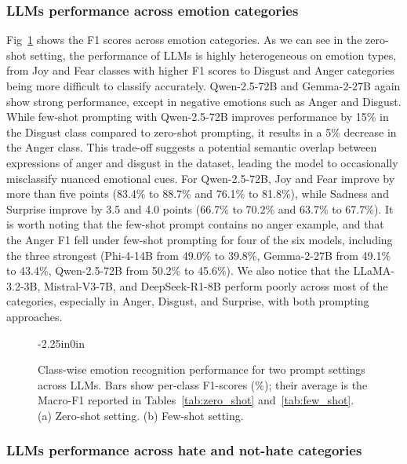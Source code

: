 \documentclass[10pt,letterpaper]{article}
\begin{document}
\subsubsection*{LLMs performance across emotion categories}

Fig~\ref{fig:emo_classwise} shows the F1 scores across emotion categories. As we can see in the zero-shot setting, the performance of LLMs is highly heterogeneous on emotion types, from Joy and Fear classes with higher F1 scores to Disgust and Anger categories being more difficult to classify accurately. Qwen-2.5-72B and Gemma-2-27B again show strong performance, except in negative emotions such as Anger and Disgust. While few-shot prompting with Qwen-2.5-72B improves performance by 15\% in the Disgust class compared to zero-shot prompting, it results in a 5\% decrease in the Anger class. This trade-off suggests a potential semantic overlap between expressions of anger and disgust in the dataset, leading the model to occasionally misclassify nuanced emotional cues. For Qwen-2.5-72B, Joy and Fear improve by more than five points (83.4\% to 88.7\% and 76.1\% to 81.8\%), while Sadness and Surprise improve by 3.5 and 4.0 points (66.7\% to 70.2\% and 63.7\% to 67.7\%). It is worth noting that the few-shot prompt contains no anger example, and that the Anger F1 fell under few-shot prompting for four of the six models, including the three strongest (Phi-4-14B from 49.0\% to 39.8\%, Gemma-2-27B from 49.1\% to 43.4\%, Qwen-2.5-72B from 50.2\% to 45.6\%). We also notice that the LLaMA-3.2-3B, Mistral-V3-7B, and DeepSeek-R1-8B perform poorly across most of the categories, especially in Anger, Disgust, and Surprise, with both prompting approaches.

\begin{figure}[t]
\begin{adjustwidth}{-2.25in}{0in}
    \centering
    \caption{Class-wise emotion recognition performance for two prompt settings across LLMs. Bars show per-class F1-scores (\%); their average is the Macro-F1 reported in Tables~\ref{tab:zero_shot} and~\ref{tab:few_shot}. (a) Zero-shot setting. (b) Few-shot setting.}
    \label{fig:emo_classwise}
\end{adjustwidth}
\end{figure}

\subsubsection*{LLMs performance across hate and not-hate categories}
\label{sec:hate_classwise}
\end{document}

